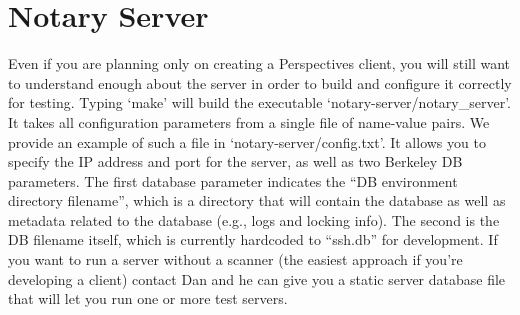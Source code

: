 \documentclass[pdftex,singlecolumn,11pt,letterpaper]{article}
\newcommand{\name}{Perspectives\xspace}
\begin{document}
\section{Notary Server}

Even if you are planning only on creating a \name client, you will still want
to understand enough about the server in order to build and configure it 
correctly for testing.  Typing `make' will build the executable 
`notary-server/notary\_server'.  It takes all configuration parameters from
a single file of name-value pairs.  We provide an example of such a file in
`notary-server/config.txt'.  It allows you to specify the IP address and port
for the server, as well as two Berkeley DB parameters.  The first database
parameter indicates the ``DB environment directory filename'', 
which is a directory
that will contain the database as well as metadata related to the database
(e.g., logs and locking info).  The second is the DB filename itself, which
is currently hardcoded to ``ssh.db'' for development.  If you want to run a 
server without a scanner (the easiest approach if you're developing a client)
contact Dan and he can give you a static server database file that will let
you run one or more test servers.  
\end{document}
